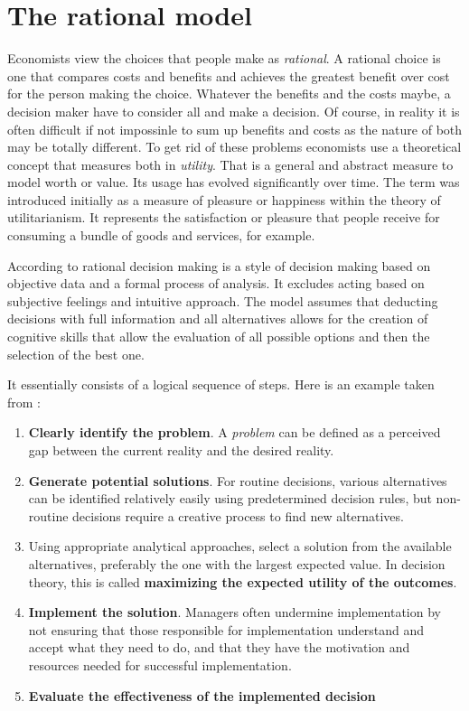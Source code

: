 \documentclass[
  12pt,
  oneside]{book}
\theoremstyle{definition}
\theoremstyle{definition}
\theoremstyle{definition}
\theoremstyle{definition}
\theoremstyle{remark}
\begin{document}
\hypertarget{the-rational-model}{%
\section{The rational model}\label{the-rational-model}}

Economists view the choices that people make as \emph{rational}. A rational choice is one that compares costs and benefits and achieves the greatest benefit over cost for the person making the choice. Whatever the benefits and the costs maybe, a decision maker have to consider all and make a decision. Of course, in reality it is often difficult if not impossinle to sum up benefits and costs as the nature of both may be totally different. To get rid of these problems economists use a theoretical concept that measures both in \emph{utility}. That is a general and abstract measure to model worth or value. Its usage has evolved significantly over time. The term was introduced initially as a measure of pleasure or happiness within the theory of utilitarianism. It represents the satisfaction or pleasure that people receive for consuming a bundle of goods and services, for example.

According to \citet{CEOpedia2021Rational} rational decision making is a style of decision making based on objective data and a formal process of analysis. It excludes acting based on subjective feelings and intuitive approach. The model assumes that deducting decisions with full information and all alternatives allows for the creation of cognitive skills that allow the evaluation of all possible options and then the selection of the best one.

It essentially consists of a logical sequence of steps. Here is an example taken from \citet[p.~13]{Fitzgerald2002Decision}:

\begin{enumerate}
\def\labelenumi{\arabic{enumi}.}
\item
  \textbf{Clearly identify the problem}. A \emph{problem} can be defined as a perceived gap between the current reality and the desired reality.
\item
  \textbf{Generate potential solutions}. For routine decisions, various alternatives can be identified relatively easily using predetermined decision rules, but non-routine decisions require a creative process to find new alternatives.
\item
  Using appropriate analytical approaches, select a solution from the available alternatives, preferably the one with the largest expected value. In decision theory, this is called \textbf{maximizing the expected utility of the outcomes}.
\item
  \textbf{Implement the solution}. Managers often undermine implementation by not ensuring that those responsible for implementation understand and accept what they need to do, and that they have the motivation and resources needed for successful implementation.
\item
  \textbf{Evaluate the effectiveness of the implemented decision}
\end{enumerate}
\end{document}
